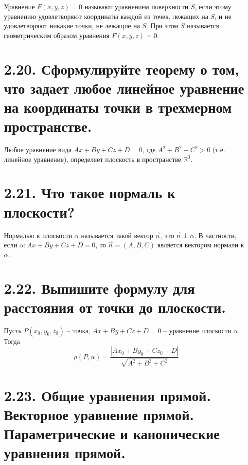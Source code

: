 \documentclass{article}
\begin{document}
Уравнение $F(x, y, z) = 0$ называют уравнением поверхности $S$, если этому уравнению удовлетворяют координаты каждой из точек, лежащих на $S$, и не удовлетворяют никакие точки, не лежащие на $S$. При этом $S$ называется геометрическим образом уравнения $F(x, y, z) = 0$.

\section*{\LARGE 2.20. Сформулируйте теорему о том, что задает любое линейное уравнение на координаты точки в трехмерном пространстве.  }

Любое уравнение вида $Ax + By + Cz + D = 0$, где $A^2 + B^2 + C^2 > 0$ (т.е. линейное уравнение), определяет плоскость в пространстве $\mathbb{R}^3$.

\section*{\LARGE 2.21. Что такое нормаль к плоскости?  }

Нормалью к плоскости $\alpha$ называется такой вектор $\vec{n}$, что $\vec{n} \perp \alpha$. В частности, если $\alpha : Ax + By + Cz + D = 0$, то $\vec{n} = (A, B, C)$ является вектором нормали к $\alpha$.

\section*{\LARGE 2.22. Выпишите формулу для расстояния от точки до плоскости. }

Пусть $P(x_0, y_0, z_0)$ -- точка, $Ax + By + Cz + D = 0$ -- уравнение плоскости $\alpha$. Тогда 
$$
\rho(P, \alpha) = \frac{|Ax_0 + By_0 + Cz_0 + D|}{\sqrt{A^2 + B^2 + C^2}} 
$$

\section*{\LARGE 2.23. Общие уравнения прямой. Векторное уравнение прямой. Параметрические и канонические уравнения прямой.  }
\end{document}

